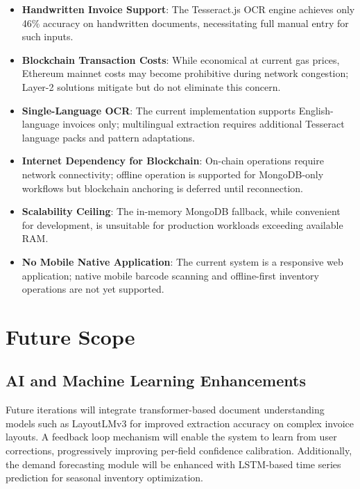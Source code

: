 \documentclass[conference]{IEEEtran}
\begin{document}
\begin{itemize}
    \item \textbf{Handwritten Invoice Support}: The Tesseract.js OCR engine achieves only 46\% accuracy on handwritten documents, necessitating full manual entry for such inputs.
    \item \textbf{Blockchain Transaction Costs}: While economical at current gas prices, Ethereum mainnet costs may become prohibitive during network congestion; Layer-2 solutions mitigate but do not eliminate this concern.
    \item \textbf{Single-Language OCR}: The current implementation supports English-language invoices only; multilingual extraction requires additional Tesseract language packs and pattern adaptations.
    \item \textbf{Internet Dependency for Blockchain}: On-chain operations require network connectivity; offline operation is supported for MongoDB-only workflows but blockchain anchoring is deferred until reconnection.
    \item \textbf{Scalability Ceiling}: The in-memory MongoDB fallback, while convenient for development, is unsuitable for production workloads exceeding available RAM.
    \item \textbf{No Mobile Native Application}: The current system is a responsive web application; native mobile barcode scanning and offline-first inventory operations are not yet supported.
\end{itemize}

\section{Future Scope}

\subsection{AI and Machine Learning Enhancements}
Future iterations will integrate transformer-based document understanding models such as LayoutLMv3 for improved extraction accuracy on complex invoice layouts. A feedback loop mechanism will enable the system to learn from user corrections, progressively improving per-field confidence calibration. Additionally, the demand forecasting module will be enhanced with LSTM-based time series prediction for seasonal inventory optimization.
\end{document}
